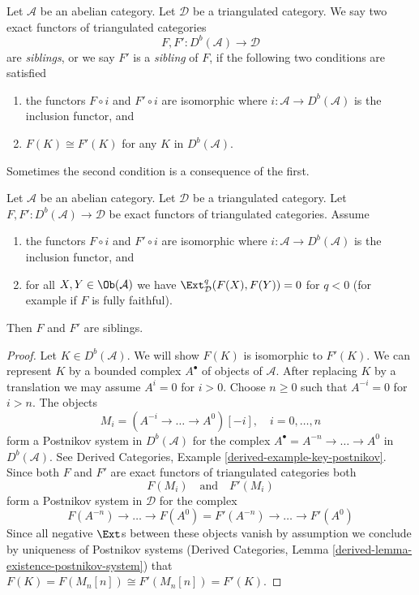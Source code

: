 \begin{definition}
\label{definition-siblings}
Let $\mathcal{A}$ be an abelian category. Let $\mathcal{D}$ be a
triangulated category. We say two exact functors of triangulated categories
$$
F, F' : D^b(\mathcal{A}) \longrightarrow \mathcal{D}
$$
are {\it siblings}, or we say $F'$ is a {\it sibling} of $F$,
if the following two conditions are satisfied
\begin{enumerate}
\item the functors $F \circ i$ and $F' \circ i$ are isomorphic
where $i : \mathcal{A} \to D^b(\mathcal{A})$ is the inclusion functor, and
\item $F(K) \cong F'(K)$ for any $K$ in $D^b(\mathcal{A})$.
\end{enumerate}
\end{definition}

\noindent
Sometimes the second condition is a consequence of the first.

\begin{lemma}
\label{lemma-sibling-fully-faithful}
Let $\mathcal{A}$ be an abelian category. Let $\mathcal{D}$ be a
triangulated category. Let
$F, F' : D^b(\mathcal{A}) \longrightarrow \mathcal{D}$
be exact functors of triangulated categories. Assume
\begin{enumerate}
\item the functors $F \circ i$ and $F' \circ i$ are isomorphic
where $i : \mathcal{A} \to D^b(\mathcal{A})$ is the inclusion functor, and
\item for all $X, Y \in \Ob(\mathcal{A})$ we have
$\Ext^q_\mathcal{D}(F(X), F(Y)) = 0$ for $q < 0$ (for example
if $F$ is fully faithful).
\end{enumerate}
Then $F$ and $F'$ are siblings.
\end{lemma}

\begin{proof}
Let $K \in D^b(\mathcal{A})$. We will show $F(K)$ is isomorphic to $F'(K)$.
We can represent $K$ by a bounded complex $A^\bullet$ of objects of
$\mathcal{A}$. After replacing $K$ by a translation we may
assume $A^i = 0$ for $i > 0$. Choose $n \geq 0$ such that $A^{-i} = 0$
for $i > n$. The objects
$$
M_i = (A^{-i} \to \ldots \to A^0)[-i],\quad i = 0, \ldots, n
$$
form a Postnikov system in $D^b(\mathcal{A})$ for the complex
$A^\bullet = A^{-n} \to \ldots \to A^0$ in $D^b(\mathcal{A})$.
See Derived Categories, Example \ref{derived-example-key-postnikov}.
Since both $F$ and $F'$ are exact functors of triangulated categories both
$$
F(M_i)
\quad\text{and}\quad
F'(M_i)
$$
form a Postnikov system in $\mathcal{D}$ for the complex
$$
F(A^{-n}) \to \ldots \to F(A^0) =
F'(A^{-n}) \to \ldots \to F'(A^0)
$$
Since all negative $\Ext$s between these objects vanish by assumption
we conclude by uniqueness of Postnikov systems
(Derived Categories, Lemma \ref{derived-lemma-existence-postnikov-system})
that $F(K) = F(M_n[n]) \cong F'(M_n[n]) = F'(K)$.
\end{proof}

